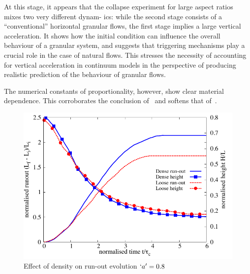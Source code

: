At this stage, it appears that the collapse experiment
for large aspect ratios mixes two very different dynam-
ics: while the second stage consists of a ``conventional''
horizontal granular flows, the first stage implies a large
vertical acceleration. It shows how the initial condition
can influence the overall behaviour of a granular
system, and suggests that triggering mechanisms play a
crucial role in the case of natural flows. This stresses
the necessity of accounting for vertical acceleration in
continuum models in the perspective of producing realistic prediction of the 
behaviour of granular flows.

The numerical constants of proportionality, however, show clear material 
dependence. This corroborates the conclusion 
of~\citet{Lajeunesse2004,Balmforth2005} and 
softens that of~\citet{Lube2005}.

\begin{figure}[tbhp]
\centering
\includegraphics[width=\textwidth]{runout_height_dense_r18}
\caption{Effect of density on run-out evolution $`a' = 0.8$}
\label{fig:runout_height_dense_r18}
\end{figure}

